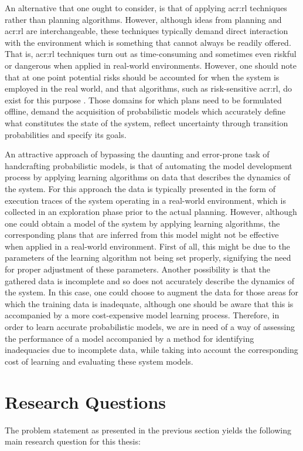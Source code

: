 An alternative that one ought to consider, is that of applying \acrshort{acr:rl} techniques rather than planning algorithms.
However, although ideas from planning and \acrshort{acr:rl} are interchangeable, these techniques typically demand direct interaction with the environment which is something that cannot always be readily offered.
That is, \acrshort{acr:rl} techniques turn out as time-consuming and sometimes even riskful or dangerous when applied in real-world environments.
However, one should note that at one point potential risks should be accounted for when the system is employed in the real world, and that algorithms, such as risk-sensitive \acrshort{acr:rl}, do exist for this purpose \cite{garcia2015comprehensive,Moldovan2012}.
Those domains for which plans need to be formulated offline, demand the acquisition of probabilistic models which accurately define what constitutes the state of the system, reflect uncertainty through transition probabilities and specify its goals.

An attractive approach of bypassing the daunting and error-prone task of handcrafting probabilistic models, is that of automating the model development process by applying learning algorithms on data that describes the dynamics of the system.
For this approach the data is typically presented in the form of execution traces of the system operating in a real-world environment, which is collected in an exploration phase prior to the actual planning.
However, although one could obtain a model of the system by applying learning algorithms, the corresponding plans that are inferred from this model might not be effective when applied in a real-world environment.
First of all, this might be due to the parameters of the learning algorithm not being set properly, signifying the need for proper adjustment of these parameters.
Another possibility is that the gathered data is incomplete and so does not accurately describe the dynamics of the system.
In this case, one could choose to augment the data for those areas for which the training data is inadequate, although one should be aware that this is accompanied by a more cost-expensive model learning process.
Therefore, in order to learn accurate probabilistic models, we are in need of a way of assessing the performance of a model accompanied by a method for identifying inadequacies due to incomplete data, while taking into account the corresponding cost of learning and evaluating these system models.

\section{Research Questions}
\label{sec:research-questions}
The problem statement as presented in the previous section yields the following main research question for this thesis:


